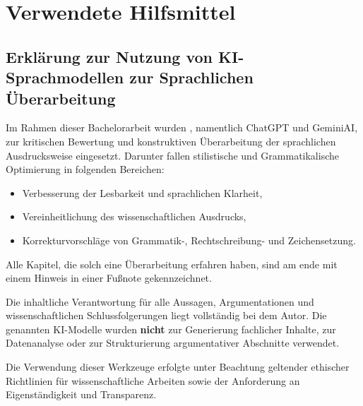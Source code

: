 
\section{Verwendete Hilfsmittel}

\subsection{Erkl\"arung zur Nutzung von KI-Sprachmodellen zur Sprachlichen \"Uberarbeitung}
Im Rahmen dieser Bachelorarbeit wurden , namentlich ChatGPT und GeminiAI, zur kritischen Bewertung und konstruktiven \"Uberarbeitung der sprachlichen Ausdrucksweise eingesetzt. Darunter fallen stilistische und Grammatikalische Optimierung in folgenden Bereichen:

\begin{itemize}
	\item Verbesserung der Lesbarkeit und sprachlichen Klarheit,
	\item Vereinheitlichung des wissenschaftlichen Ausdrucks,
	\item Korrekturvorschl\"age von Grammatik-, Rechtschreibung- und Zeichensetzung.
\end{itemize}

Alle Kapitel, die solch eine \"Uberarbeitung erfahren haben, sind am ende mit einem Hinweis in einer Fu{\ss}note gekennzeichnet.

Die inhaltliche Verantwortung f\"ur alle Aussagen, Argumentationen und wissenschaftlichen Schlussfolgerungen liegt vollst\"andig bei dem Autor. Die genannten KI-Modelle wurden \textbf{nicht} zur Generierung fachlicher Inhalte, zur Datenanalyse oder zur Strukturierung argumentativer Abschnitte verwendet.

Die Verwendung dieser Werkzeuge erfolgte unter Beachtung geltender ethischer Richtlinien f\"ur wissenschaftliche Arbeiten sowie der Anforderung an Eigenst\"andigkeit und Transparenz.